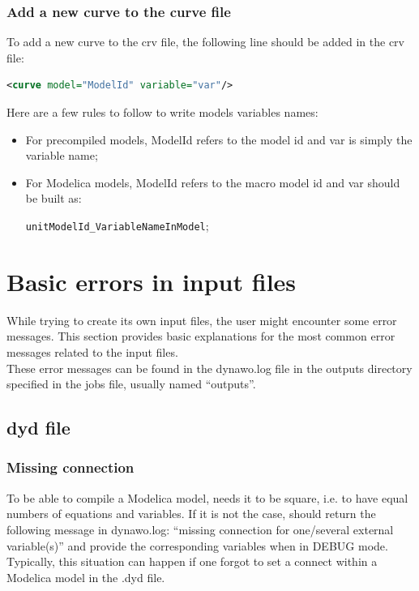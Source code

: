 \documentclass[a4paper, 12pt]{report}
\begin{document}
\subsubsection{Add a new curve to the curve file}

To add a new curve to the crv file, the following line should be added in the crv file:
\begin{lstlisting}[language=XML,numbers=none]
<curve model="ModelId" variable="var"/>
\end{lstlisting}

Here are a few rules to follow to write models variables names:
\begin{itemize}
\item For precompiled models, ModelId refers to the model id and var is simply the variable name;
\item For Modelica models, ModelId refers to the macro model id and var should be built as:

\verb|unitModelId_VariableNameInModel|;
\end{itemize}

\section{Basic errors in input files}

While trying to create its own input files, the user might encounter some error messages. This section provides basic explanations for the most common error messages related to the input files. \\

These error messages can be found in the dynawo.log file in the outputs directory specified in the jobs file, usually named ``outputs''.

\subsection{dyd file}

\subsubsection{Missing connection}

To be able to compile a Modelica model, \Dynawo needs it to be square, i.e. to have equal numbers of equations and variables. If it is not the case, \Dynawo should return the following message in dynawo.log: ``missing connection for one/several external variable(s)'' and provide the corresponding variables when in DEBUG mode. Typically, this situation can happen if one forgot to set a connect within a Modelica model in the .dyd file. \\
\end{document}
